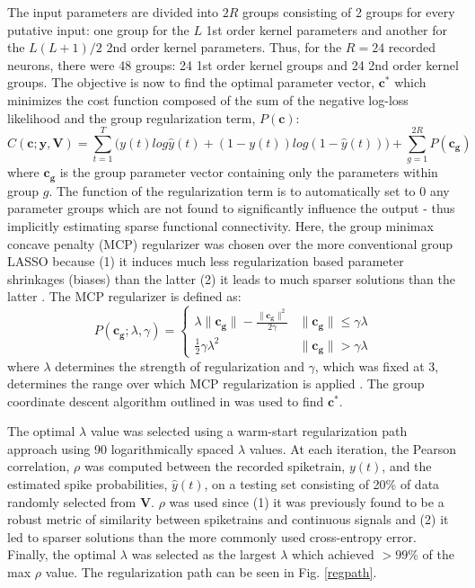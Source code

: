 \documentclass[11pt,a4paper,final]{article}
\begin{document}
The input parameters are divided into $2R$ groups consisting of 2 groups for every putative input: one group for the $L$ 1st order kernel parameters and another for the $L(L+1)/2$ 2nd order kernel parameters.
Thus, for the $R=24$ recorded neurons, there were 48 groups: 24 1st order kernel groups and 24 2nd order kernel groups.
The objective is now to find the optimal parameter vector, $\bm{c}^*$ which minimizes the cost function composed of the sum of the negative log-loss likelihood and the group regularization term, $P(\bm{c})$:
\begin{equation}
C(\bm{c};\bm{y},\bm{V})=\sum_{t=1}^T\Big(y(t)log\hat{y}(t)+(1-y(t))log(1-\hat{y}(t))\Big)+\sum_{g=1}^{2R}P(\bm{c_g})
\label{eq:cost}
\end{equation}
where $\bm{c_g}$ is the group parameter vector containing only the parameters within group $g$.
The function of the regularization term is to automatically set to 0 any parameter groups which are not found to significantly influence the output - thus implicitly estimating sparse functional connectivity.
Here, the group minimax concave penalty (MCP) regularizer was chosen over the more conventional group LASSO because (1) it induces much less regularization based parameter shrinkages (biases) than the latter (2) it leads to much sparser solutions than the latter \citep{breheny15,zhang10}.
The MCP regularizer is defined as:
\begin{equation}
P(\bm{c_g};\lambda,\gamma) =
\begin{cases}
\lambda\|\bm{c_g}\|-\frac{\|\bm{c_g}\|^2}{2\gamma}  & \|\bm{c_g}\| \leq \gamma\lambda \\
\frac{1}{2}\gamma\lambda^2                          & \|\bm{c_g}\| >    \gamma\lambda
\end{cases}
\end{equation}
where $\lambda$ determines the strength of regularization and $\gamma$, which was fixed at 3, determines the range over which MCP regularization is applied \citep{breheny15}.
The group coordinate descent algorithm outlined in \citet{breheny15} was used to find $\bm{c}^*$.

The optimal $\lambda$ value was selected using a warm-start regularization path approach using 90 logarithmically spaced $\lambda$ values.
At each iteration, the Pearson correlation, $\rho$ was computed between the recorded spiketrain, $y(t)$, and the estimated spike probabilities, $\hat{y}(t)$, on a testing set consisting of 20\% of data randomly selected from $\bm{V}$.
$\rho$ was used since (1) it was previously found to be a robust metric of similarity between spiketrains and continuous signals \citep{sandler14} and (2) it led to sparser solutions than the more commonly used cross-entropy error.
Finally, the optimal $\lambda$ was selected as the largest $\lambda$ which achieved $>99\%$ of the max $\rho$ value.
The regularization path can be seen in Fig. \ref{regpath}.
\end{document}
